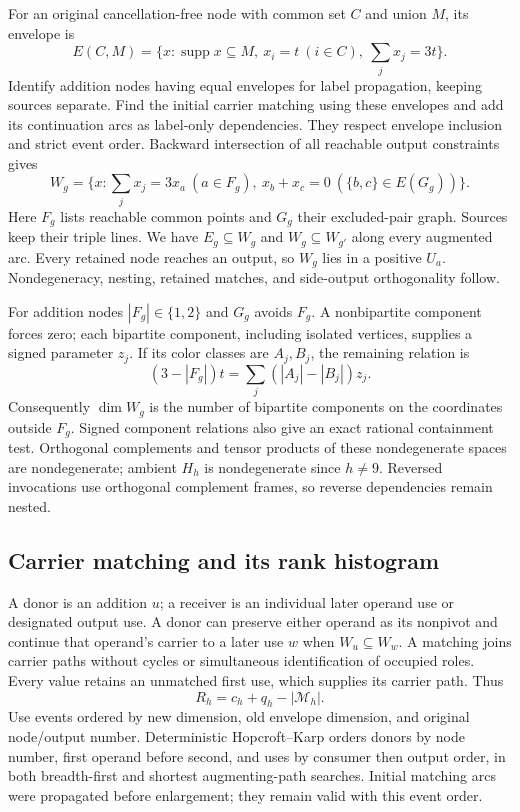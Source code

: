 For an original cancellation-free node with common set $C$ and union
$M$, its envelope is
\[
 E(C,M)=\{x:\operatorname{supp}x\subseteq M,\ x_i=t\ (i\in C),\
                    \textstyle\sum_jx_j=3t\}.
\]
Identify addition nodes having equal envelopes for label propagation,
keeping sources separate. Find the initial carrier matching using these
envelopes and add its continuation arcs as label-only dependencies.
They respect envelope inclusion and strict event order. Backward
intersection of all reachable output constraints gives
\[
 W_g=\{x:\textstyle\sum_jx_j=3x_a\ (a\in F_g),\
                    x_b+x_c=0\ (\{b,c\}\in E(G_g))\}.
\]
Here $F_g$ lists reachable common points and $G_g$ their excluded-pair
graph. Sources keep their triple lines. We have $E_g\subseteq W_g$ and
$W_g\subseteq W_{g'}$ along every augmented arc. Every retained node
reaches an output, so $W_g$ lies in a positive $U_a$. Nondegeneracy,
nesting, retained matches, and side-output orthogonality follow.

For addition nodes $|F_g|\in\{1,2\}$ and $G_g$ avoids $F_g$.
A nonbipartite component forces zero; each bipartite component, including
isolated vertices, supplies a signed parameter $z_j$. If its color
classes are $A_j,B_j$, the remaining relation is
\[
 (3-|F_g|)t=\sum_j(|A_j|-|B_j|)z_j.
\]
Consequently $\dim W_g$ is the number of bipartite components on the
coordinates outside $F_g$. Signed component relations also give an exact
rational containment test. Orthogonal complements and tensor products
of these nondegenerate spaces are nondegenerate; ambient $H_h$ is
nondegenerate since $h\ne9$. Reversed invocations use orthogonal
complement frames, so reverse dependencies remain nested.

\subsection{Carrier matching and its rank histogram}
A donor is an addition $u$; a receiver is an individual later operand
use or designated output use. A donor can preserve either operand as
its nonpivot and continue that operand's carrier to a later use $w$
when $W_u\subseteq W_w$. A matching joins carrier paths without cycles
or simultaneous identification of occupied roles. Every value retains
an unmatched first use, which supplies its carrier path. Thus
\[
 R_h=c_h+q_h-|\mathcal M_h|.
\]
Use events ordered by new dimension, old envelope dimension, and original
node/output number. Deterministic Hopcroft--Karp orders donors by node
number, first operand before second, and uses by consumer then output
order, in both breadth-first and shortest augmenting-path searches.
Initial matching arcs were propagated before enlargement; they remain
valid with this event order.

